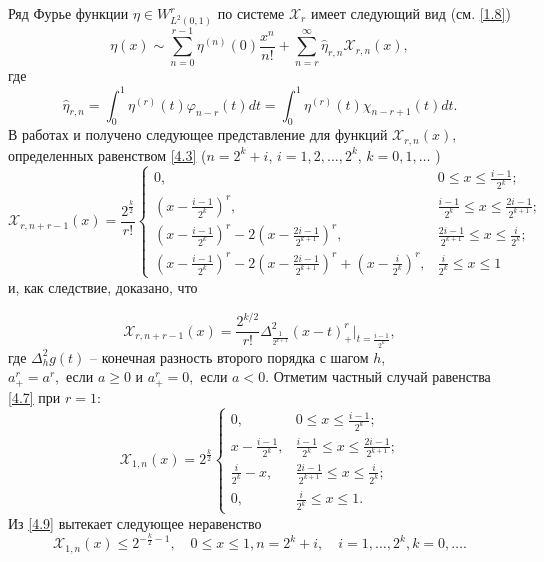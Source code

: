 Ряд Фурье функции $\eta\in W^r_{L^2(0,1)}$ по системе $\mathcal{ X}_r$ имеет следующий вид (см. \eqref{1.8})
  \begin{equation}\label{4.6}
\eta(x)\sim \sum_{n=0}^{r-1} \eta^{(n)}(0)\frac{x^n}{n!}+ \sum_{n=r}^\infty\hat \eta_{r,n}\mathcal{ X}_{r,n}(x),
\end{equation}
где
  $$
\hat \eta_{r,n}=\int_0^1 \eta^{(r)}(t)\varphi_{n-r}(t)dt=\int_0^1 \eta^{(r)}(t) \chi_{n-r+1}(t)dt.
$$
В работах \cite{Shar19} и \cite{Shar20}  получено  следующее представление для функций $\mathcal{ X}_{r,n}(x)$, определенных равенством \eqref{4.3}
 ($n=2^k+i$, $i=1,2,\ldots,2^k $, $k=0,1,\ldots$ )
  \begin{equation}\label{4.7}
 \mathcal{ X}_{r,n+r-1}(x)=\frac{2^{\frac{k}{2}}}{r!}
 \begin{cases} 0,&\text{$0\le x\le\frac{i-1}{2^k}$;}\\
 (x-\frac{i-1}{2^k})^r,&\text{$\frac{i-1}{2^k}\le x\le \frac{2i-1}{2^{k+1}}$;}\\
 (x-\frac{i-1}{2^k})^r-2(x-\frac{2i-1}{2^{k+1}})^r,&\text{$\frac{2i-1}{2^{k+1}}\le x\le \frac{i}{2^{k}}$;}\\
  (x-\frac{i-1}{2^k})^r-2(x-\frac{2i-1}{2^{k+1}})^r+(x-\frac{i}{2^{k}})^r, &\text{$\frac{i}{2^{k}}\le x\le1$}
   \end{cases}
  \end{equation}
 и, как следствие, доказано, что

   \begin{equation}\label{4.8}
 \mathcal{ X}_{r,n+r-1}(x)=\frac{2^{k/2}}{r!}\Delta^2_\frac{1}{2^{k+1}}(x-t)^r_+
 \big|_{t=\frac{i-1}{2^k}},
\end{equation}
где $\Delta^2_h g(t)$ -- конечная разность второго порядка с шагом $h$, $a_+^r=a^r, \text{ если } a\ge0 $ и $a_+^r=0, \text{ если } a<0 $. Отметим частный случай равенства \eqref{4.7} при $r=1$:
\begin{equation}\label{4.9}
 \mathcal{ X}_{1,n}(x)=2^{\frac{k}{2}}
 \begin{cases} 0,&\text{$0\le x\le\frac{i-1}{2^k}$;}\\
 x-\frac{i-1}{2^k},&\text{$\frac{i-1}{2^k}\le x\le \frac{2i-1}{2^{k+1}}$;}\\
 \frac{i}{2^{k}}-x,&\text{$\frac{2i-1}{2^{k+1}}\le x\le \frac{i}{2^{k}}$;}\\
  0, &\text{$\frac{i}{2^{k}}\le x\le1$}.
   \end{cases}
  \end{equation} Из \eqref{4.9} вытекает следующее неравенство
\begin{equation}\label{4.10}
 \mathcal{ X}_{1,n}(x)\le 2^{-\frac{k}{2}-1}, \quad 0\le x\le 1, n=2^k+i,\quad i=1,\ldots,2^k, k=0,\ldots.
  \end{equation}

